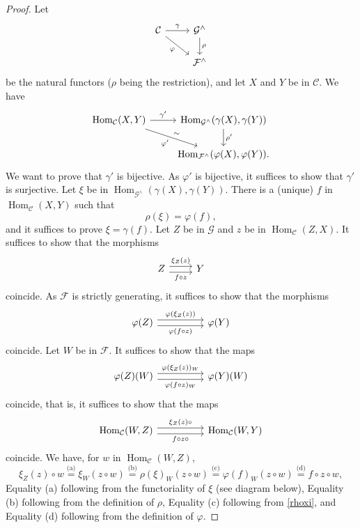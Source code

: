 \documentclass[12pt]{article}
\theoremstyle{remark}
\theoremstyle{definition}
\newcommand{\C}{\mathcal C}
\newcommand{\F}{\mathcal F}
\newcommand{\G}{\mathcal G}
\newcommand{\pp}{\varphi}
\DeclareMathOperator{\Hom}{Hom}
\begin{document}
\begin{proof}
Let 
$$
\begin{tikzcd}
\C\ar{r}{\gamma}\ar{dr}[swap]{\pp}&\G^\wedge\ar{d}{\rho}\\
&\F^\wedge
\end{tikzcd}
$$ 
be the natural functors ($\rho$ being the restriction), and let $X$ and $Y$ be in $\C$. We have 
$$
\begin{tikzcd}
\Hom_\C(X,Y)\ar{r}{\gamma'}\ar{dr}{\sim}[swap]{\pp'}&\Hom_{\G^\wedge}(\gamma(X),\gamma(Y))\ar{d}{\rho'}\\ 
{}&\Hom_{\F^\wedge}(\pp(X),\pp(Y)). 
\end{tikzcd}
$$ 
We want to prove that $\gamma'$ is bijective. As $\pp'$ is bijective, it suffices to show that $\gamma'$ is surjective. Let $\xi$ be in $\Hom_{\G^\wedge}(\gamma(X),\gamma(Y))$. There is a (unique) $f$ in $\Hom_\C(X,Y)$ such that  
\begin{equation}\label{rhoxi}
\rho(\xi)=\pp(f),
\end{equation}
and it suffices to prove $\xi=\gamma(f)$. Let $Z$ be in $\G$ and $z$ be in $\Hom_\C(Z,X)$. It suffices to show that the morphisms 
$$
\begin{tikzcd}
Z\arrow[yshift=0.7ex]{r}{\xi_Z(z)}\arrow[yshift=-0.7ex]{r}[swap]{f\circ z}&Y
\end{tikzcd}
$$ 
coincide. As $\F$ is strictly generating, it suffices to show that the morphisms 
$$
\begin{tikzcd}
\pp(Z)\arrow[yshift=0.7ex]{rr}{\pp(\xi_Z(z))}\arrow[yshift=-0.7ex]{rr}[swap]{\pp(f\circ z)}&&\pp(Y)
\end{tikzcd}
$$ 
coincide. Let $W$ be in $\F$. It suffices to show that the maps 
$$
\begin{tikzcd}
\pp(Z)(W)\arrow[yshift=0.7ex]{rr}{\pp(\xi_Z(z))_W}\arrow[yshift=-0.7ex]{rr}[swap]{\pp(f\circ z)_W}&&\pp(Y)(W)
\end{tikzcd}
$$ 
coincide, that is, it suffices to show that the maps 
$$
\begin{tikzcd}
\Hom_\C(W,Z)\arrow[yshift=0.7ex]{rr}{\xi_Z(z)\circ}\arrow[yshift=-0.7ex]{rr}[swap]{f\circ z\circ}&&\Hom_\C(W,Y)
\end{tikzcd}
$$ 
coincide. We have, for $w$ in $\Hom_\C(W,Z)$,
$$
\xi_Z(z)\circ w
\overset{\text{(a)}}{=}\xi_W(z\circ w)
\overset{\text{(b)}}{=}\rho(\xi)_W(z\circ w)
\overset{\text{(c)}}{=}\pp(f)_W(z\circ w)
\overset{\text{(d)}}{=}f\circ z\circ w, 
$$ 
Equality (a) following from the functoriality of $\xi$ (see diagram below), Equality (b) following from the definition of $\rho$, Equality (c) following from \eqref{rhoxi}, and Equality (d) following from the definition of $\pp$.
\end{proof}
\end{document}
